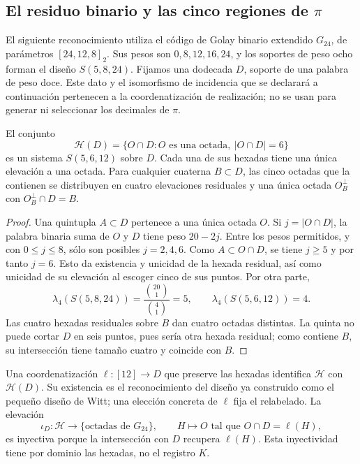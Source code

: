 

\subsection{El residuo binario y las cinco regiones de \texorpdfstring{$\pi$}{pi}}
\label{exc:cinco-regiones}

El siguiente reconocimiento utiliza el código de Golay binario
extendido $G_{24}$, de parámetros $[24,12,8]_2$. Sus pesos son
$0,8,12,16,24$, y los soportes de peso ocho forman el diseño
$S(5,8,24)$. Fijamos una dodecada $D$, soporte de una palabra de peso
doce. Este dato y el isomorfismo de incidencia que se declarará a
continuación pertenecen a la coordenatización de realización; no se usan para
generar ni seleccionar los decimales de $\pi$.

\begin{proposition}
\label{exc:residuo-binario}
El conjunto
\[
 \mathcal H(D)=
 \{O\cap D: O\text{ es una octada},\ |O\cap D|=6\}
\]
es un sistema $S(5,6,12)$ sobre $D$. Cada una de sus hexadas tiene
una única elevación a una octada. Para cualquier cuaterna $B\subset D$,
las cinco octadas que la contienen se distribuyen en cuatro elevaciones
residuales y una única octada $O_B^\perp$ con $O_B^\perp\cap D=B$.
\end{proposition}

\begin{proof}
Una quintupla $A\subset D$ pertenece a una única octada $O$. Si
$j=|O\cap D|$, la palabra binaria suma de $O$ y $D$ tiene peso
$20-2j$. Entre los pesos permitidos, y con $0\leq j\leq8$, sólo
son posibles $j=2,4,6$. Como $A\subset O\cap D$, se tiene $j\geq5$
y por tanto $j=6$. Esto da existencia y unicidad de la hexada
residual, así como unicidad de su elevación al escoger cinco de sus
puntos. Por otra parte,
\[
 \lambda_4(S(5,8,24))=\frac{\binom{20}1}{\binom41}=5,
 \qquad
 \lambda_4(S(5,6,12))=4.
\]
Las cuatro hexadas residuales sobre $B$ dan cuatro octadas distintas.
La quinta no puede cortar $D$ en seis puntos, pues sería otra hexada
residual; como contiene $B$, su intersección tiene tamaño cuatro y
coincide con $B$.
\end{proof}

Una coordenatización $\ell:[12]\to D$ que preserve las hexadas identifica
$\mathcal H$ con $\mathcal H(D)$. Su existencia es el reconocimiento
del diseño ya construido como el pequeño diseño de Witt; una elección
concreta de $\ell$ fija el relabelado. La elevación
\[
 \iota_D:\mathcal H\longrightarrow
       \{\text{octadas de }G_{24}\},
 \qquad H\longmapsto O\text{ tal que }O\cap D=\ell(H),
\]
es inyectiva porque la intersección con $D$ recupera $\ell(H)$.
Esta inyectividad tiene por dominio las hexadas, no el registro $K$.

